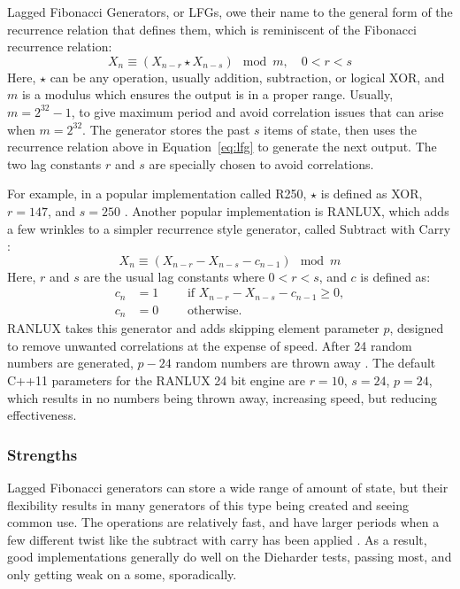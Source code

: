 Lagged Fibonacci Generators, or LFGs, owe their name to the general form of the recurrence relation that defines them, which is reminiscent of the Fibonacci recurrence relation:
\begin{equation} \label{eq:lfg}
    X_{n} \equiv \left(X_{n-r} \star X_{n-s}\right) \mod m,\quad 0 < r < s
\end{equation}
Here, $\star$ can be any operation, usually addition, subtraction, or logical XOR, and $m$ is a modulus which ensures the output is in a proper range. Usually, $m=2^{32} - 1$, to give maximum period and avoid correlation issues that can arise when $m=2^32$. The generator stores the past $s$ items of state, then uses the recurrence relation above in Equation~\ref{eq:lfg} to generate the next output. The two lag constants $r$ and $s$ are specially chosen to avoid correlations.

For example, in a popular implementation called R250, $\star$ is defined as XOR, $r=147$, and $s=250$ \cite{kirkpatrick1981very}. Another popular implementation is RANLUX, which adds a few wrinkles to a simpler recurrence style generator, called Subtract with Carry \cite{marsaglia1991new,marsaglia2003random}:
\begin{equation} \label{eqn:swc}
    X_{n} \equiv \left(X_{n-r} - X_{n-s} - c_{n-1}\right) \mod m
\end{equation}
Here, $r$ and $s$ are the usual lag constants where $0 < r < s$, and $c$ is defined as:
\begin{align*}
    c_n &= 1 \qquad \text{ if } X_{n-r} - X_{n-s} - c_{n-1} \geq 0, \\
    c_n &= 0 \qquad \text{ otherwise.}
\end{align*}
RANLUX takes this generator and adds skipping element parameter $p$, designed to remove unwanted correlations at the expense of speed. After 24 random numbers are generated, $p-24$ random numbers are thrown away \cite{luscher1994portable,james1994ranlux}. The default C++11 parameters for the RANLUX 24 bit engine are $r = 10$, $s = 24$, $p=24$, which results in no numbers being thrown away, increasing speed, but reducing effectiveness.

\subsubsection{Strengths}
Lagged Fibonacci generators can store a wide range of amount of state, but their flexibility results in many generators of this type being created and seeing common use. The operations are relatively fast, and have larger periods when a few different twist like the subtract with carry has been applied \cite{marsaglia2003random}. As a result, good implementations generally do well on the Dieharder tests, passing most, and only getting weak on a some, sporadically.

